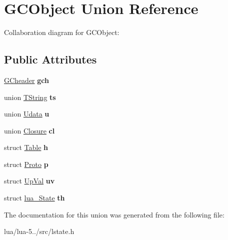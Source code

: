 \hypertarget{union_g_c_object}{\section{G\+C\+Object Union Reference}
\label{union_g_c_object}
}


Collaboration diagram for G\+C\+Object\+:
\subsection*{Public Attributes}
\begin{DoxyCompactItemize}
\item 
\hypertarget{union_g_c_object_a1abd8f26ec7f6d3c47da2b9411b87a95}{\hyperlink{struct_g_cheader}{G\+Cheader} {\bfseries gch}}\label{union_g_c_object_a1abd8f26ec7f6d3c47da2b9411b87a95}

\item 
\hypertarget{union_g_c_object_a13c9e846aed214f15f08856eff708156}{union \hyperlink{union_t_string}{T\+String} {\bfseries ts}}\label{union_g_c_object_a13c9e846aed214f15f08856eff708156}

\item 
\hypertarget{union_g_c_object_acb21de33631e8e6c232e25afa5719d70}{union \hyperlink{union_udata}{Udata} {\bfseries u}}\label{union_g_c_object_acb21de33631e8e6c232e25afa5719d70}

\item 
\hypertarget{union_g_c_object_a6333069bf1033586bb75a9d099781cb9}{union \hyperlink{union_closure}{Closure} {\bfseries cl}}\label{union_g_c_object_a6333069bf1033586bb75a9d099781cb9}

\item 
\hypertarget{union_g_c_object_a1386073c8162a56cf73946847579fd5b}{struct \hyperlink{struct_table}{Table} {\bfseries h}}\label{union_g_c_object_a1386073c8162a56cf73946847579fd5b}

\item 
\hypertarget{union_g_c_object_a0f07556fc701098194d000a1bb4b0e6a}{struct \hyperlink{struct_proto}{Proto} {\bfseries p}}\label{union_g_c_object_a0f07556fc701098194d000a1bb4b0e6a}

\item 
\hypertarget{union_g_c_object_aa6b546130da6430205f25864900a4202}{struct \hyperlink{struct_up_val}{Up\+Val} {\bfseries uv}}\label{union_g_c_object_aa6b546130da6430205f25864900a4202}

\item 
\hypertarget{union_g_c_object_a09dfef993a41cb62497249e7ccf6fb5f}{struct \hyperlink{structlua___state}{lua\+\_\+\+State} {\bfseries th}}\label{union_g_c_object_a09dfef993a41cb62497249e7ccf6fb5f}

\end{DoxyCompactItemize}


The documentation for this union was generated from the following file\+:\begin{DoxyCompactItemize}
\item 
lua/lua-\/5../src/lstate.\+h\end{DoxyCompactItemize}
